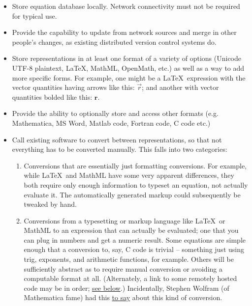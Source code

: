 \documentclass[12pt,letterpaper]{article}
\begin{document}
\begin{itemize}
\item Store equation database locally. Network connectivity must not be required for typical use.
\item Provide the capability to update from network sources and merge in other people's changes,
      as existing distributed version control systems do.
\item Store representations in at least one format of a variety of options
      (Unicode UTF-8 plaintext, \LaTeX, MathML, OpenMath, etc.)
      as well as a way to add more specific forms.
      For example, one might be a \LaTeX\ expression with the vector quantities having arrows like this:
      $\vec{r}$;
      and another with vector quantities bolded like this:
      $\mathbf{r}$.
\item Provide the ability to optionally store and access other formats
      (e.g. Mathematica, MS Word, Matlab code, Fortran code, C code etc.)
\item Call existing software to convert between representations,
      so that not everything has to be converted manually.
      This falls into two categories:
      \begin{enumerate}
      \item Conversions that are essentially just formatting conversions.
            For example, while \LaTeX\ and MathML have some very apparent differences,
            they both require only enough information to typeset an equation,
            not actually evaluate it.
            The automatically generated markup could subsequently be tweaked by hand.
      \item Conversions from a typesetting or markup language like \LaTeX\ or MathML to an expression that can actually be evaluated;
            one that you can plug in numbers and get a numeric result.
            Some equations are simple enough that a conversion to, say, C code is trivial
            -- something just using trig, exponents, and arithmetic functions, for example.
            Others will be sufficiently abstract as to require manual conversion or avoiding a computable format at all.
            (Alternately, a link to some remotely hosted code may be in order;
            \hyperref[itm:linking]{see below}.)
            Incidentally, Stephen Wolfram (of Mathematica fame) had this
            \href{http://www.stephenwolfram.com/publications/recent/mathml/mathml1.html}{to say}
            about this kind of conversion.
                \begin{quote}

\end{quote}
\end{enumerate}
\end{itemize}
\end{document}
